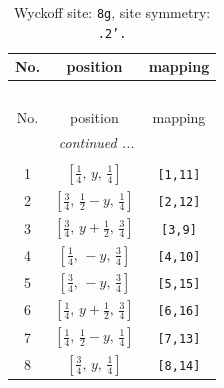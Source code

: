 \documentclass[fleqn,8pt]{jsarticle}
\begin{document}
\renewcommand{\arraystretch}{1.2}
\begin{longtable}{ccc}
\caption{Wyckoff site: {\tt 8g}, site symmetry: {\tt .2'.}}
 \\
 \hline \hline
No. & position & mapping \\ \hline \endfirsthead

\multicolumn{2}{l}{\tablename\ \thetable{}} \\
 \hline \hline
No. & position & mapping \\ \hline \endhead

 \hline \hline
\multicolumn{2}{r}{\footnotesize\it continued ...} \\ \endfoot

 \hline \hline
\multicolumn{2}{r}{} \\ \endlastfoot

1 & $\left[ \frac{1}{4},\, y,\, \frac{1}{4} \right]$ & {\tt [1,11]} \\ \hline
2 & $\left[ \frac{3}{4},\, \frac{1}{2} - y,\, \frac{1}{4} \right]$ & {\tt [2,12]} \\ \hline
3 & $\left[ \frac{3}{4},\, y + \frac{1}{2},\, \frac{3}{4} \right]$ & {\tt [3,9]} \\ \hline
4 & $\left[ \frac{1}{4},\, - y,\, \frac{3}{4} \right]$ & {\tt [4,10]} \\ \hline
5 & $\left[ \frac{3}{4},\, - y,\, \frac{3}{4} \right]$ & {\tt [5,15]} \\ \hline
6 & $\left[ \frac{1}{4},\, y + \frac{1}{2},\, \frac{3}{4} \right]$ & {\tt [6,16]} \\ \hline
7 & $\left[ \frac{1}{4},\, \frac{1}{2} - y,\, \frac{1}{4} \right]$ & {\tt [7,13]} \\ \hline
8 & $\left[ \frac{3}{4},\, y,\, \frac{1}{4} \right]$ & {\tt [8,14]} \\
\end{longtable}
\renewcommand{\arraystretch}{1.2}
\end{document}

